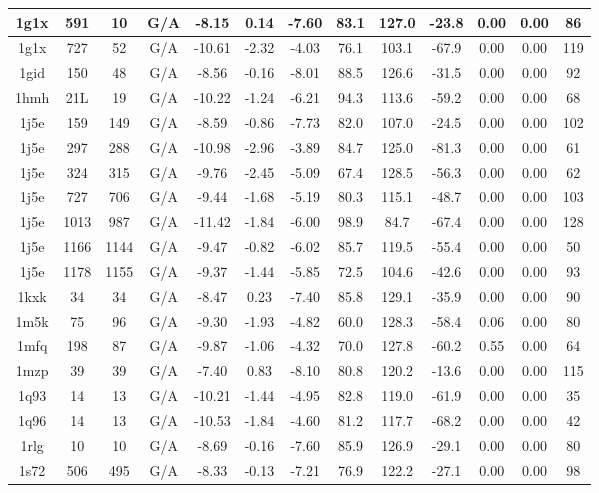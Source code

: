 {\begin{center}
\begin{longtable}{|c|c|c|c|c|c|c|c|c|c|c|c|c|}
1g1x & 591 & 10 & G/A & -8.15 & 0.14 & -7.60 & 83.1 & 127.0 & -23.8 & 0.00 & 0.00 & 86 \\ \hline
1g1x & 727 & 52 & G/A & -10.61 & -2.32 & -4.03 & 76.1 & 103.1 & -67.9 & 0.00 & 0.00 & 119 \\ \hline
1gid & 150 & 48 & G/A & -8.56 & -0.16 & -8.01 & 88.5 & 126.6 & -31.5 & 0.00 & 0.00 & 92 \\ \hline
1hmh & 21L & 19 & G/A & -10.22 & -1.24 & -6.21 & 94.3 & 113.6 & -59.2 & 0.00 & 0.00 & 68 \\ \hline
1j5e & 159 & 149 & G/A & -8.59 & -0.86 & -7.73 & 82.0 & 107.0 & -24.5 & 0.00 & 0.00 & 102 \\ \hline
1j5e & 297 & 288 & G/A & -10.98 & -2.96 & -3.89 & 84.7 & 125.0 & -81.3 & 0.00 & 0.00 & 61 \\ \hline
1j5e & 324 & 315 & G/A & -9.76 & -2.45 & -5.09 & 67.4 & 128.5 & -56.3 & 0.00 & 0.00 & 62 \\ \hline
1j5e & 727 & 706 & G/A & -9.44 & -1.68 & -5.19 & 80.3 & 115.1 & -48.7 & 0.00 & 0.00 & 103 \\ \hline
1j5e & 1013 & 987 & G/A & -11.42 & -1.84 & -6.00 & 98.9 & 84.7 & -67.4 & 0.00 & 0.00 & 128 \\ \hline
1j5e & 1166 & 1144 & G/A & -9.47 & -0.82 & -6.02 & 85.7 & 119.5 & -55.4 & 0.00 & 0.00 & 50 \\ \hline
1j5e & 1178 & 1155 & G/A & -9.37 & -1.44 & -5.85 & 72.5 & 104.6 & -42.6 & 0.00 & 0.00 & 93 \\ \hline
1kxk & 34 & 34 & G/A & -8.47 & 0.23 & -7.40 & 85.8 & 129.1 & -35.9 & 0.00 & 0.00 & 90 \\ \hline
1m5k & 75 & 96 & G/A & -9.30 & -1.93 & -4.82 & 60.0 & 128.3 & -58.4 & 0.06 & 0.00 & 80 \\ \hline
1mfq & 198 & 87 & G/A & -9.87 & -1.06 & -4.32 & 70.0 & 127.8 & -60.2 & 0.55 & 0.00 & 64 \\ \hline
1mzp & 39 & 39 & G/A & -7.40 & 0.83 & -8.10 & 80.8 & 120.2 & -13.6 & 0.00 & 0.00 & 115 \\ \hline
1q93 & 14 & 13 & G/A & -10.21 & -1.44 & -4.95 & 82.8 & 119.0 & -61.9 & 0.00 & 0.00 & 35 \\ \hline
1q96 & 14 & 13 & G/A & -10.53 & -1.84 & -4.60 & 81.2 & 117.7 & -68.2 & 0.00 & 0.00 & 42 \\ \hline
1rlg & 10 & 10 & G/A & -8.69 & -0.16 & -7.60 & 85.9 & 126.9 & -29.1 & 0.00 & 0.00 & 80 \\ \hline
1s72 & 506 & 495 & G/A & -8.33 & -0.13 & -7.21 & 76.9 & 122.2 & -27.1 & 0.00 & 0.00 & 98 \\ \hline

\end{longtable}
\end{center}}

